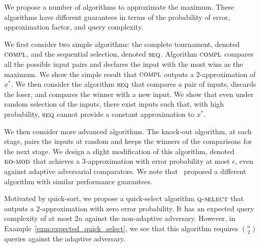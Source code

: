 \documentclass[twoside,11pt]{article}
\newcommand{\algorithms}[1]{\textsc{#1}}
\newcommand{\algseq}{\algorithms{seq}}
\newcommand{\algcomp}{\algorithms{compl}}
\newcommand{\algkomod}{\algorithms{ko-mod}}
\newcommand{\algquickselect}{\algorithms{q-select}}
\newcommand{\maxx}{x^*}
\newcommand{\errorcomb}{\epsilon}
\begin{document}
We propose a number of algorithms to approximate the
maximum. These algorithms have different  guarantees in
terms of the probability of error, approximation factor, and query
complexity.  

We first consider two simple algorithms: the complete tournament,
denoted $\algcomp$, and the sequential selection,
denoted $\algseq$. Algorithm $\algcomp$ compares
all the possible input pairs and declares the input with the
most wins as the maximum.  We show the simple result
that $\algcomp$ outputs a $2$-approximation of
$\maxx$.  We then consider the algorithm $\algseq$ that
compares a pair of inputs, discards the loser, and compares the
winner with a new input. We show that even under random selection of
the inputs, there exist inputs such that, with high probability,
$\algseq$ cannot provide a constant approximation to $\maxx$.

  We then consider more advanced algorithms.
  The knock-out algorithm, at each stage, pairs the
  inputs at random and keeps the winners of the comparisons for the
  next stage. We design a slight modification of this algorithm,
  denoted $\algkomod$ that achieves a $3$-approximation with error
  probability at most $\errorcomb$, even against adaptive adversarial
  comparators.  We note that~\citet{AjtaiFHN15} proposed a different
algorithm with similar performance guarantees.

Motivated by quick-sort, we propose a quick-select algorithm
$\algquickselect$ that outputs a $2$-approximation with zero
  error probability. It has an expected query complexity of at most
  $2n$ against the non-adaptive adversary. However, in
  Example~\ref{exm:expected_quick_select}, we see that this algorithm
  requires $\binom n2$ queries against the adaptive adversary.
\end{document}
